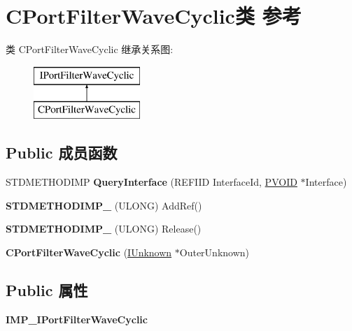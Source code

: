 \hypertarget{class_c_port_filter_wave_cyclic}{}\section{C\+Port\+Filter\+Wave\+Cyclic类 参考}
\label{class_c_port_filter_wave_cyclic}
类 C\+Port\+Filter\+Wave\+Cyclic 继承关系图\+:\begin{figure}[H]
\begin{center}
\leavevmode
\includegraphics[height=2.000000cm]{class_c_port_filter_wave_cyclic}
\end{center}
\end{figure}
\subsection*{Public 成员函数}
\begin{DoxyCompactItemize}
\item 
\mbox{\label{class_c_port_filter_wave_cyclic_a0e4b6053ef74c2f277aadac5e7393529}} 
S\+T\+D\+M\+E\+T\+H\+O\+D\+I\+MP {\bfseries Query\+Interface} (R\+E\+F\+I\+ID Interface\+Id, \hyperlink{interfacevoid}{P\+V\+O\+ID} $\ast$Interface)
\item 
\mbox{\label{class_c_port_filter_wave_cyclic_a67ceed698d05b92e1d1d36ce13d41867}} 
{\bfseries S\+T\+D\+M\+E\+T\+H\+O\+D\+I\+M\+P\+\_\+} (U\+L\+O\+NG) Add\+Ref()
\item 
\mbox{\label{class_c_port_filter_wave_cyclic_aff3c5f56b4f466bc85161612520cbc1b}} 
{\bfseries S\+T\+D\+M\+E\+T\+H\+O\+D\+I\+M\+P\+\_\+} (U\+L\+O\+NG) Release()
\item 
\mbox{\label{class_c_port_filter_wave_cyclic_ade1d598e84380e8be86088be15a0a656}} 
{\bfseries C\+Port\+Filter\+Wave\+Cyclic} (\hyperlink{interface_i_unknown}{I\+Unknown} $\ast$Outer\+Unknown)
\end{DoxyCompactItemize}
\subsection*{Public 属性}
\begin{DoxyCompactItemize}
\item 
\mbox{\label{class_c_port_filter_wave_cyclic_afbbba843c9df08f777061f56507da363}} 
{\bfseries I\+M\+P\+\_\+\+I\+Port\+Filter\+Wave\+Cyclic}
\end{DoxyCompactItemize}
